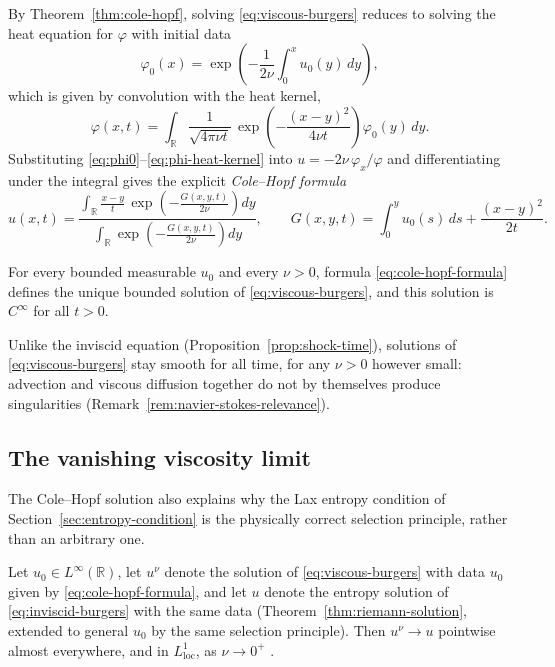 By Theorem~\ref{thm:cole-hopf}, solving \eqref{eq:viscous-burgers} reduces
to solving the heat equation for $\varphi$ with initial data
\begin{equation}
  \label{eq:phi0}
  \varphi_0(x) = \exp\left(-\frac{1}{2\nu}\int_0^x u_0(y)\, dy\right),
\end{equation}
which is given by convolution with the heat kernel,
\begin{equation}
  \label{eq:phi-heat-kernel}
  \varphi(x,t) = \int_{\mathbb{R}} \frac{1}{\sqrt{4\pi\nu t}}\,
    \exp\left(-\frac{(x-y)^2}{4\nu t}\right) \varphi_0(y)\, dy.
\end{equation}
Substituting \eqref{eq:phi0}--\eqref{eq:phi-heat-kernel} into
$u=-2\nu\,\varphi_x/\varphi$ and differentiating under the integral gives
the explicit \emph{Cole--Hopf formula}
\begin{equation}
  \label{eq:cole-hopf-formula}
  u(x,t) = \frac{\displaystyle\int_{\mathbb{R}} \frac{x-y}{t}\, \exp\left(-\frac{G(x,y,t)}{2\nu}\right) dy}
                {\displaystyle\int_{\mathbb{R}} \exp\left(-\frac{G(x,y,t)}{2\nu}\right) dy},
  \qquad
  G(x,y,t) = \int_0^y u_0(s)\, ds + \frac{(x-y)^2}{2t}.
\end{equation}

\begin{corollary}
\label{cor:global-smoothness}
For every bounded measurable $u_0$ and every $\nu>0$, formula
\eqref{eq:cole-hopf-formula} defines the unique bounded solution of
\eqref{eq:viscous-burgers}, and this solution is $C^\infty$ for all
$t>0$.
\end{corollary}

Unlike the inviscid equation (Proposition~\ref{prop:shock-time}),
solutions of \eqref{eq:viscous-burgers} stay smooth for all time, for
any $\nu>0$ however small: advection and viscous diffusion together do
not by themselves produce singularities (Remark~\ref{rem:navier-stokes-relevance}).

\subsection{The vanishing viscosity limit}
\label{subsec:vanishing-viscosity}

The Cole--Hopf solution also explains why the Lax entropy condition of
Section~\ref{sec:entropy-condition} is the physically correct selection
principle, rather than an arbitrary one.

\begin{theorem}
\label{thm:vanishing-viscosity}
Let $u_0\in L^\infty(\mathbb{R})$, let $u^\nu$ denote the solution of
\eqref{eq:viscous-burgers} with data $u_0$ given by
\eqref{eq:cole-hopf-formula}, and let $u$ denote the entropy solution of
\eqref{eq:inviscid-burgers} with the same data
(Theorem~\ref{thm:riemann-solution}, extended to general $u_0$ by the same
selection principle). Then $u^\nu \to u$ pointwise almost everywhere,
and in $L^1_{\mathrm{loc}}$, as $\nu \to 0^+$ \cite{hopf1950}.
\end{theorem}

